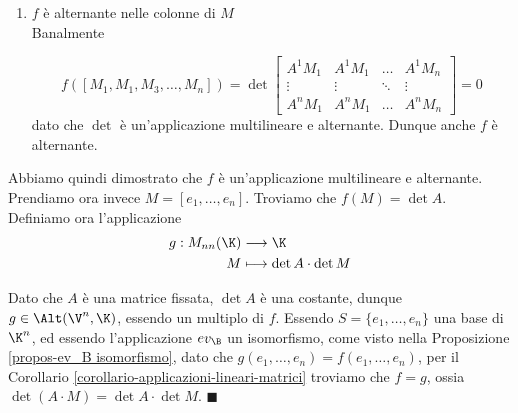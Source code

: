 \documentclass[11pt, a4paper, titlepage, oneside]{scrbook}
\begin{document}
\begin{enumerate}[label=\arabic*°]
Essendo poi $\det$ multilineare, concludiamo che
\[
 \det \begin{bmatrix}
        \lambda A^1 C & \dots & \lambda A^1 M_n \\
        \vdots & \ddots & \vdots \\
        \lambda A^n C & \dots & \lambda A^n M_n
    \end{bmatrix} = 
    \lambda \det \begin{bmatrix}
        A^1 C & \dots & A^1 M_n \\
        \vdots & \ddots & \vdots \\
        A^n C & \dots & A^n M_n
    \end{bmatrix}
    + \mu \det \begin{bmatrix}
        A^1 D & \dots & A^1 M_n \\
        \vdots & \ddots & \vdots \\
        A^n C & \dots & A^n M_n
    \end{bmatrix}
\]

Dunque anche $f$ è multilineare.

\item $f$ è alternante nelle colonne di $M$ \\
Banalmente

\[
f([M_1, M_1, M_3, \ldots, M_n]) = \det \begin{bmatrix}
    A^1 M_1 & A^1 M_1 & \dots & A^1 M_n \\
    \vdots & \vdots & \ddots & \vdots \\
    A^n M_1 & A^n M_1 & \dots & A^n M_n
\end{bmatrix} = 0
\]
dato che $\det$ è un'applicazione multilineare e alternante. Dunque anche $f$ è alternante.
\end{enumerate}

Abbiamo quindi dimostrato che $f$ è un'applicazione multilineare e alternante. \\
Prendiamo ora invece $M = [e_1, \ldots, e_n]$. Troviamo che $f(M) = \det A$. Definiamo ora l'applicazione
\begin{align*}
g: M_{nn}(\K) &\longrightarrow \K \\
M &\longmapsto \det A \cdot \det M
\end{align*}

Dato che $A$ è una matrice fissata, $\det A$ è una costante, dunque $g \in \Alt(\V^n, \K)$, essendo un multiplo di $f$. Essendo $S = \{e_1, \ldots, e_n\}$ una base di $\K^n$, ed essendo l'applicazione $ev_\B$ un isomorfismo, come visto nella Proposizione \ref{propos-ev_B isomorfismo}, dato che $g(e_1, \ldots, e_n) = f(e_1, \ldots, e_n)$, per il Corollario \ref{corollario-applicazioni-lineari-matrici} troviamo che $f = g$, ossia \mbox{$\det (A \cdot M) = \det A \cdot \det M$}. $\blacksquare$
\end{document}
